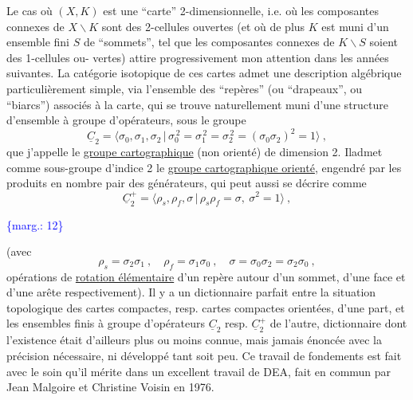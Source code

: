 \documentclass[11pt]{article}
\newcommand{\scanpage}[1]{\par\bigskip\noindent{\small\sffamily[scan #1]}\par}
\newcommand{\mspage}[1]{{\small\sffamily[p.\,#1]}}
\newcommand{\margin}[1]{\textcolor{blue}{\{\textsf{marg.:} #1\}}}
\newcommand{\uline}[1]{\underline{#1}}
\begin{document}
Le cas où $(X,K)$ est une ``carte'' 2-dimensionnelle, i.e.
où les composantes connexes de $X\backslash K$ sont des 2-cellules ouvertes
(et où de plus $K$ est muni d'un ensemble fini $S$ de ``sommets'',
tel que les composantes connexes de $K\backslash S$ soient des 1-cellules ou-%
vertes) attire progressivement mon attention dans les années suivantes.
La catégorie isotopique de ces cartes admet une description algébrique
particulièrement simple, via l'ensemble des ``repères'' (ou ``drapeaux'',
ou ``biarcs'') associés à la carte, qui se trouve naturellement muni
d'une structure d'ensemble à groupe d'opérateurs, sous le groupe
\[ \underline{C}_2 = \langle \sigma_0,\sigma_1,\sigma_2 \,|\, \sigma_0^{\,2} = \sigma_1^{\,2} = \sigma_2^{\,2} = (\sigma_0\sigma_2)^2 = 1 \rangle \ , \]
que j'appelle le \uline{groupe cartographique} (non orienté) de dimension 2.
Iladmet comme sous-groupe d'indice 2 le \uline{groupe cartographique orienté},
engendré par les produits en nombre pair des générateurs, qui peut
aussi se décrire comme
\[ \underline{C}_2^{+} = \langle \rho_s,\rho_f,\sigma \,|\, \rho_s\rho_f = \sigma,\ \sigma^2 = 1 \rangle \ , \]

\margin{12}

\clearpage
\scanpage{119/13}
\mspage{11}

(avec
\[ \rho_s = \sigma_2\sigma_1 \ , \quad \rho_f = \sigma_1\sigma_0 \ , \quad \sigma = \sigma_0\sigma_2 = \sigma_2\sigma_0 \ , \]
opérations de \uline{rotation élémentaire} d'un repère autour d'un sommet,
d'une face et d'une arête respectivement). Il y a un dictionnaire
parfait entre la situation topologique des cartes compactes, resp.
cartes compactes orientées, d'une part, et les ensembles finis à
groupe d'opérateurs $\underline{C}_2$ resp. $\underline{C}_2^+$ de l'autre, dictionnaire dont
l'existence était d'ailleurs plus ou moins connue, mais jamais
énoncée avec la précision nécessaire, ni développé tant soit peu.
Ce travail de fondements est fait avec le soin qu'il mérite dans
un excellent travail de DEA, fait en commun par Jean Malgoire et
Christine Voisin en 1976.
\end{document}
